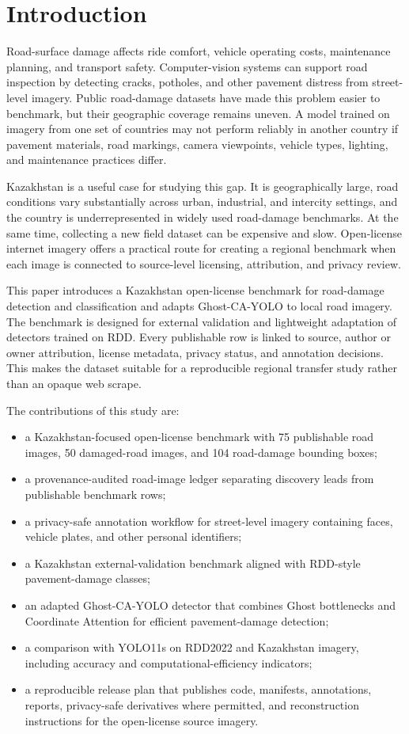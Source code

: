 \documentclass[applsci,article,submit,moreauthors]{Definitions/mdpi}
\begin{document}
\section{Introduction}

Road-surface damage affects ride comfort, vehicle operating costs, maintenance planning, and transport safety. Computer-vision systems can support road inspection by detecting cracks, potholes, and other pavement distress from street-level imagery. Public road-damage datasets have made this problem easier to benchmark, but their geographic coverage remains uneven. A model trained on imagery from one set of countries may not perform reliably in another country if pavement materials, road markings, camera viewpoints, vehicle types, lighting, and maintenance practices differ.

Kazakhstan is a useful case for studying this gap. It is geographically large, road conditions vary substantially across urban, industrial, and intercity settings, and the country is underrepresented in widely used road-damage benchmarks. At the same time, collecting a new field dataset can be expensive and slow. Open-license internet imagery offers a practical route for creating a regional benchmark when each image is connected to source-level licensing, attribution, and privacy review.

This paper introduces a Kazakhstan open-license benchmark for road-damage detection and classification and adapts Ghost-CA-YOLO to local road imagery. The benchmark is designed for external validation and lightweight adaptation of detectors trained on RDD. Every publishable row is linked to source, author or owner attribution, license metadata, privacy status, and annotation decisions. This makes the dataset suitable for a reproducible regional transfer study rather than an opaque web scrape.

The contributions of this study are:

\begin{itemize}
\item a Kazakhstan-focused open-license benchmark with 75 publishable road images, 50 damaged-road images, and 104 road-damage bounding boxes;
\item a provenance-audited road-image ledger separating discovery leads from publishable benchmark rows;
\item a privacy-safe annotation workflow for street-level imagery containing faces, vehicle plates, and other personal identifiers;
\item a Kazakhstan external-validation benchmark aligned with RDD-style pavement-damage classes;
\item an adapted Ghost-CA-YOLO detector that combines Ghost bottlenecks and Coordinate Attention for efficient pavement-damage detection;
\item a comparison with YOLO11s on RDD2022 and Kazakhstan imagery, including accuracy and computational-efficiency indicators;
\item a reproducible release plan that publishes code, manifests, annotations, reports, privacy-safe derivatives where permitted, and reconstruction instructions for the open-license source imagery.
\end{itemize}
\end{document}
